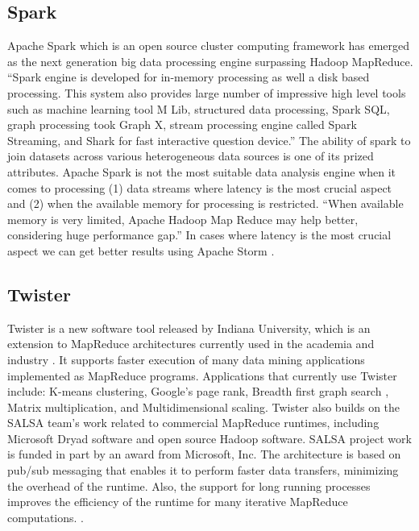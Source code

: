 \subsection{Spark}

     Apache Spark which is an open source cluster computing framework
     has emerged as the next generation big data processing engine
     surpassing Hadoop MapReduce. ``Spark engine is developed for
     in-memory processing as well a disk based processing. This system
     also provides large number of impressive high level tools such as
     machine learning tool M Lib, structured data processing, Spark
     SQL, graph processing took Graph X, stream processing engine
     called Spark Streaming, and Shark for fast interactive question
     device.'' The ability of spark to join datasets across various
     heterogeneous data sources is one of its prized
     attributes. Apache Spark is not the most suitable data analysis
     engine when it comes to processing (1) data streams where latency
     is the most crucial aspect and (2) when the available memory for
     processing is restricted. ``When available memory is very limited,
     Apache Hadoop Map Reduce may help better, considering huge
     performance gap.'' In cases where latency is the most crucial
     aspect we can get better results using Apache Storm \cite{www-spark}.
     
\subsection{Twister \cv}

     Twister is a new software tool released by Indiana University,
     which is an extension to MapReduce architectures currently used
     in the academia and industry \cite{www-twister1}. It supports
     faster execution of many data mining applications implemented as
     MapReduce programs. Applications that currently use Twister
     include: K-means clustering, Google's page rank, Breadth first
     graph search , Matrix multiplication, and Multidimensional
     scaling. Twister also builds on the SALSA team's work related to
     commercial MapReduce runtimes, including Microsoft Dryad software
     and open source Hadoop software. SALSA project work is funded in
     part by an award from Microsoft, Inc. The architecture is based
     on pub/sub messaging that enables it to perform faster data
     transfers, minimizing the overhead of the runtime. Also, the
     support for long running processes improves the efficiency of the
     runtime for many iterative MapReduce
     computations. \cite{www-twister2} \cite{www-twister3}
     \cite{paper-twister}.

